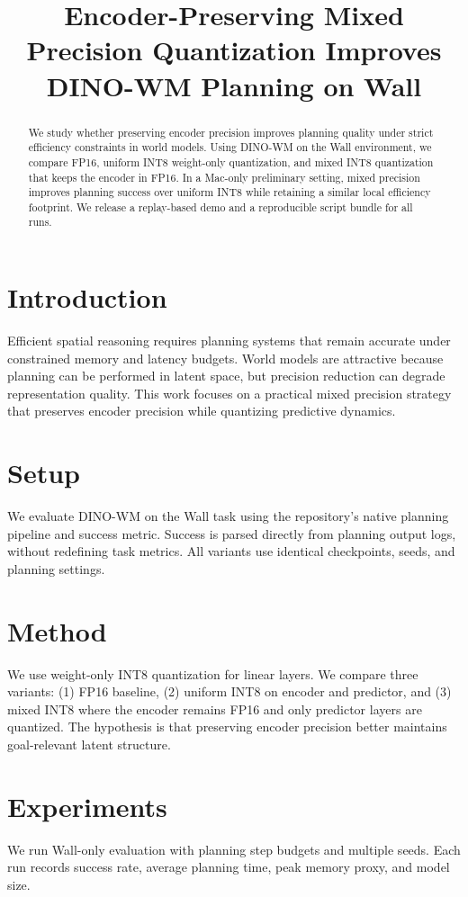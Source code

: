 \documentclass{article}
\title{Encoder-Preserving Mixed Precision Quantization Improves DINO-WM Planning on Wall}
\author{}
\begin{document}
\maketitle

\begin{abstract}
We study whether preserving encoder precision improves planning quality under strict efficiency constraints in world models.
Using DINO-WM on the Wall environment, we compare FP16, uniform INT8 weight-only quantization, and mixed INT8 quantization that keeps the encoder in FP16.
In a Mac-only preliminary setting, mixed precision improves planning success over uniform INT8 while retaining a similar local efficiency footprint.
We release a replay-based demo and a reproducible script bundle for all runs.
\end{abstract}

\section{Introduction}
Efficient spatial reasoning requires planning systems that remain accurate under constrained memory and latency budgets.
World models are attractive because planning can be performed in latent space, but precision reduction can degrade representation quality.
This work focuses on a practical mixed precision strategy that preserves encoder precision while quantizing predictive dynamics.

\section{Setup}
We evaluate DINO-WM \citep{zhou2024dinowm} on the Wall task using the repository's native planning pipeline and success metric.
Success is parsed directly from planning output logs, without redefining task metrics.
All variants use identical checkpoints, seeds, and planning settings.

\section{Method}
We use weight-only INT8 quantization for linear layers.
We compare three variants: (1) FP16 baseline, (2) uniform INT8 on encoder and predictor, and (3) mixed INT8 where the encoder remains FP16 and only predictor layers are quantized.
The hypothesis is that preserving encoder precision better maintains goal-relevant latent structure.

\section{Experiments}
We run Wall-only evaluation with planning step budgets and multiple seeds.
Each run records success rate, average planning time, peak memory proxy, and model size.
\end{document}
